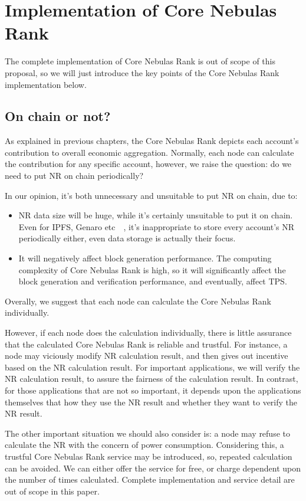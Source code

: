 
\section{Implementation of Core Nebulas Rank}
The complete implementation of Core Nebulas Rank is out of scope of this proposal, so we will just introduce the key points of the Core Nebulas Rank implementation below.

\subsection{On chain or not? \label{sec:onchain}}
As explained in previous chapters, the Core Nebulas Rank depicts each account’s contribution to overall economic aggregation. Normally, each node can calculate the contribution for any specific account, however, we raise the question: do we need to put NR on chain periodically?

In our opinion, it’s both unnecessary and unsuitable to put NR on chain, due to:
\begin{itemize}
\item NR data size will be huge, while it’s certainly unsuitable to put it on chain. Even for IPFS, Genaro etc~\cite{IPFS}~\cite{Genaro}, it’s inappropriate to store every account’s NR periodically either, even data storage is actually their focus. 
\item It will negatively affect block generation performance. The computing complexity of Core Nebulas Rank is high, so it will significantly affect the block generation and verification performance, and eventually, affect TPS.
\end{itemize}
\noindent Overally, we suggest that each node can calculate the Core Nebulas Rank individually.

However, if each node does the calculation individually, there is little assurance that the calculated Core Nebulas Rank is reliable and trustful. For instance, a node may viciously modify NR calculation result, and then gives out incentive based on the NR calculation result. For important applications, we will verify the NR calculation result, to assure the fairness of the calculation result. In contrast, for those applications that are not so important, it depends upon the applications themselves that how they use the NR result and whether they want to verify the NR result.

The other important situation we should also consider is: a node may refuse to calculate the NR with the concern of power consumption. Considering this, a trustful Core Nebulas Rank service may be introduced, so, repeated calculation can be avoided. We can either offer the service for free, or charge dependent upon the number of times calculated. Complete implementation and service detail are out of scope in this paper.

